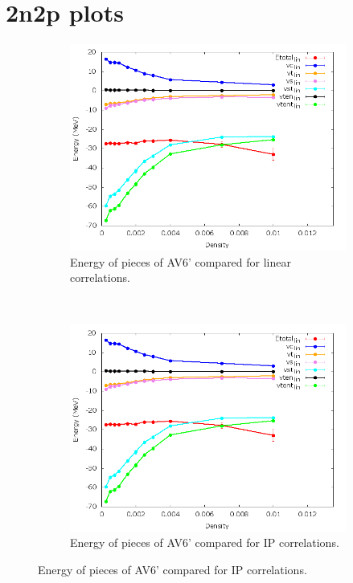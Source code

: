 \documentclass[12pt]{article}
\newcommand{\red}[1]{{\color{red}{#1}}}
\begin{document}
\section{2n2p plots}
\begin{figure}[h!]
   \centering
   \begin{subfigure}{0.49\textwidth}
      \includegraphics[width=\textwidth]{../av6_2n2p_lin.png}
      \caption{Energy of pieces of AV6' compared for linear correlations.}
   \end{subfigure}
   ~
   \begin{subfigure}{0.49\textwidth}
      \includegraphics[width=\textwidth]{../av6_2n2p_lin.png}
      \caption{\red{Placeholder for IP plot, currently lin.}Energy of pieces of AV6' compared for IP correlations.}

\end{subfigure}
\end{figure}
\end{document}
